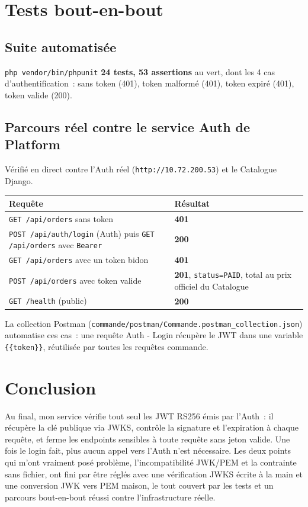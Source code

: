 \documentclass[11pt,a4paper]{article}
\begin{document}
\section{Tests bout-en-bout}

\subsection{Suite automatisée}

\texttt{php vendor/bin/phpunit} \textrightarrow{} \textbf{24 tests, 53 assertions} au vert,
dont les 4 cas d'authentification~: sans token (401), token malformé (401), token expiré (401),
token valide (200).

\subsection{Parcours réel contre le service Auth de Platform}

Vérifié en direct contre l'Auth réel (\texttt{http://10.72.200.53}) et le Catalogue Django.

\begin{tabularx}{\textwidth}{@{}P{8.2cm} Y@{}}
\toprule
\textbf{Requête} & \textbf{Résultat} \\
\midrule
\texttt{GET /api/orders} sans token & \textbf{401} \\[3pt]
\texttt{POST /api/auth/login} (Auth) puis \texttt{GET /api/orders} avec \texttt{Bearer} & \textbf{200} \\[3pt]
\texttt{GET /api/orders} avec un token bidon & \textbf{401} \\[3pt]
\texttt{POST /api/orders} avec token valide & \textbf{201}, \texttt{status=PAID}, total au prix officiel du Catalogue \\[3pt]
\texttt{GET /health} (public) & \textbf{200} \\
\bottomrule
\end{tabularx}

La collection Postman (\texttt{commande/postman/Commande.postman\_collection.json}) automatise
ces cas~: une requête \og Auth - Login\fg{} récupère le JWT dans une variable \texttt{\{\{token\}\}},
réutilisée par toutes les requêtes commande.

\section{Conclusion}

Au final, mon service vérifie tout seul les JWT RS256 émis par l'Auth~: il récupère la clé
publique via JWKS, contrôle la signature et l'expiration à chaque requête, et ferme les
endpoints sensibles à toute requête sans jeton valide. Une fois le login fait, plus aucun appel
vers l'Auth n'est nécessaire. Les deux points qui m'ont vraiment posé problème, l'incompatibilité
JWK/PEM et la contrainte \og sans fichier\fg{}, ont fini par être réglés avec une vérification
JWKS écrite à la main et une conversion JWK vers PEM maison, le tout couvert par les tests et un
parcours bout-en-bout réussi contre l'infrastructure réelle.
\end{document}
